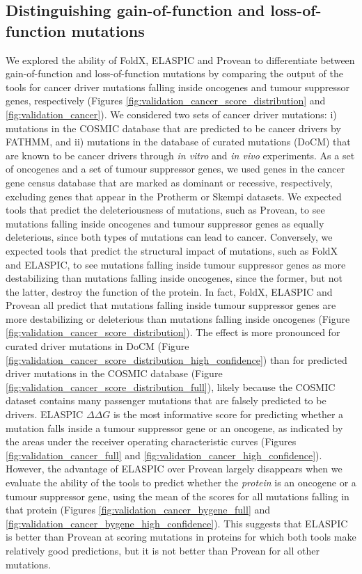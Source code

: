 \clearpage

\clearpage


\subsection{Distinguishing gain-of-function and loss-of-function mutations}

We explored the ability of FoldX, ELASPIC and Provean to differentiate between gain-of-function and loss-of-function mutations by comparing the output of the tools for cancer driver mutations falling inside oncogenes and tumour suppressor genes, respectively (Figures \ref{fig:validation_cancer_score_distribution} and \ref{fig:validation_cancer}). We considered two sets of cancer driver mutations: i) mutations in the COSMIC database that are predicted to be cancer drivers by FATHMM, and ii) mutations in the database of curated mutations (DoCM) \cite{griffith_civic:_2016} that are known to be cancer drivers through \textit{in vitro} and \textit{in vivo} experiments. As a set of oncogenes and a set of tumour suppressor genes, we used genes in the cancer gene census database \cite{futreal_census_2004} that are marked as dominant or recessive, respectively, excluding genes that appear in the Protherm or Skempi datasets. We expected tools that predict the deleteriousness of mutations, such as Provean, to see mutations falling inside oncogenes and tumour suppressor genes as equally deleterious, since both types of mutations can lead to cancer. Conversely, we expected tools that predict the structural impact of mutations, such as FoldX and ELASPIC, to see mutations falling inside tumour suppressor genes as more destabilizing than mutations falling inside oncogenes, since the former, but not the latter, destroy the function of the protein. In fact, FoldX, ELASPIC and Provean all predict that mutations falling inside tumour suppressor genes are more destabilizing or deleterious than mutations falling inside oncogenes (Figure \ref{fig:validation_cancer_score_distribution}). The effect is more pronounced for curated driver mutations in DoCM (Figure \ref{fig:validation_cancer_score_distribution_high_confidence}) than for predicted driver mutations in the COSMIC database (Figure \ref{fig:validation_cancer_score_distribution_full}), likely because the COSMIC dataset contains many passenger mutations that are falsely predicted to be drivers. ELASPIC $\Delta \Delta G$ is the most informative score for predicting whether a mutation falls inside a tumour suppressor gene or an oncogene, as indicated by the areas under the receiver operating characteristic curves (Figures \ref{fig:validation_cancer_full} and \ref{fig:validation_cancer_high_confidence}). However, the advantage of ELASPIC over Provean largely disappears when we evaluate the ability of the tools to predict whether the \textit{protein} is an oncogene or a tumour suppressor gene, using the mean of the scores for all mutations falling in that protein (Figures \ref{fig:validation_cancer_bygene_full} and \ref{fig:validation_cancer_bygene_high_confidence}). This suggests that ELASPIC is better than Provean at scoring mutations in proteins for which both tools make relatively good predictions, but it is not better than Provean for all other mutations.

\clearpage

